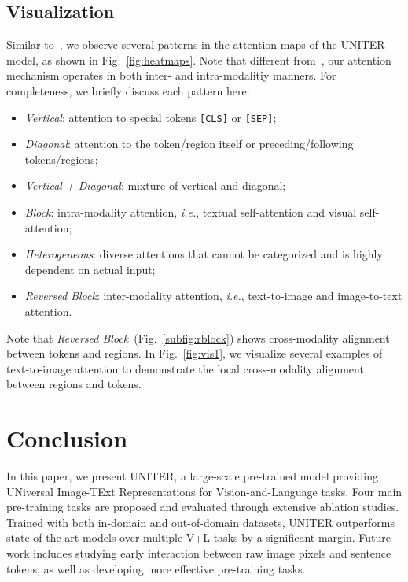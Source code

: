 \documentclass[runningheads]{llncs}
\begin{document}
 \subsection{Visualization} \label{sec:vis}
Similar to~\cite{kovaleva2019revealing}, we observe several patterns in the attention maps of the UNITER model, as shown in Fig.~\ref{fig:heatmaps}.
Note that different from~\cite{kovaleva2019revealing}, our attention mechanism operates in both inter- and intra-modalitiy manners.
For completeness, we briefly discuss each pattern here:
\begin{itemize}
  \item \textit{Vertical}: attention to special tokens \texttt{[CLS]} or \texttt{[SEP]};
  \item \textit{Diagonal}: attention to the token/region itself or preceding/following tokens/regions;
  \item \textit{Vertical + Diagonal}: mixture of vertical and diagonal;
  \item \textit{Block}: intra-modality attention, \textit{i.e.}, textual self-attention and visual self-attention;
  \item \textit{Heterogeneous}: diverse attentions that cannot be categorized and is highly dependent on actual input;
  \item \textit{Reversed Block}: inter-modality attention, \textit{i.e.}, text-to-image and image-to-text attention.
\end{itemize}
Note that \textit{Reversed Block}~(Fig.~\ref{subfig:rblock}) shows cross-modality alignment between tokens and regions.
In Fig.~\ref{fig:vis1}, we visualize several examples of text-to-image attention to demonstrate the local cross-modality alignment between regions and tokens.

\section{Conclusion}
In this paper, we present UNITER, a large-scale pre-trained model providing UNiversal Image-TExt Representations for Vision-and-Language tasks. Four main pre-training tasks are proposed and evaluated through extensive ablation studies. 
Trained with both in-domain and out-of-domain datasets, UNITER outperforms state-of-the-art models over multiple V+L tasks by a significant margin.
Future work includes studying early interaction between raw image pixels and sentence tokens, as well as developing more effective pre-training tasks. 
\clearpage


\end{document}
